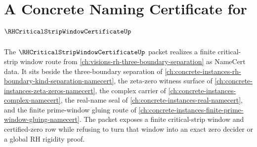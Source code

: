\chapter{A Concrete Naming Certificate for $\RHCriticalStripWindowCertificateUp$}
\label{ch:concrete-instances-rh-critical-strip-window-certificate-namecert}

The $\RHCriticalStripWindowCertificateUp$ packet realizes a finite critical-strip window route from \autoref{ch:visions-rh-three-boundary-separation} as NameCert data. It sits beside the three-boundary separation of \autoref{ch:concrete-instances-rh-boundary-kind-separation-namecert}, the zeta-zero witness surface of \autoref{ch:concrete-instances-zeta-zeros-namecert}, the complex carrier of \autoref{ch:concrete-instances-complex-namecert}, the real-name seal of \autoref{ch:concrete-instances-real-namecert}, and the finite prime-window gluing route of \autoref{ch:concrete-instances-finite-prime-window-gluing-namecert}. The packet exposes a finite critical-strip window and certified-zero row while refusing to turn that window into an exact zero decider or a global RH rigidity proof.

